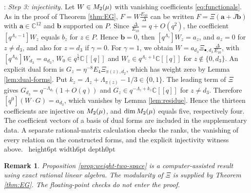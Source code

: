 \documentclass[leqno]{article}
\newcommand{\Cbb}{\ensuremath{\mathbb{C}}}
\let\cal\relax
\newcommand{\cal}{\mathcal}
\newcommand{\qed}{\hfill \vrule height6pt  width6pt depth0pt}
\newtheorem{remark}[thm]{Remark}
\newenvironment{proof}[1][]{\noindent {\it Proof #1} : }{\hbox{~}\qed
\smallskip
}
\numberwithin{equation}{section}
\begin{document}
\begin{proof}
\textit{Step 3: injectivity.} Let $W \in \cal M_2(\mu)$ with vanishing coefficients \eqref{eq:functionals}. As in the proof of Theorem \ref{thm:EG}, $F = W\frac{E_{10}}{\Delta}$ can be written $F = \Xi(\mathbf a+J\mathbf b)$ with $\mathbf a \in \Cbb^{12}$ and $\mathbf b$ supported on $P$. Since $\frac{\Delta}{E_{10}} = q+O(q^2)$, the coefficient $[q^{\Lambda_z-1}]W_z$ equals $b_z$ for $z \in P$. Hence $\mathbf b = 0$, then $[q^{\Lambda_z}]W_z = a_z$, and $a_z = 0$ for $z \neq d_3$, and also for $z = d_3$ if $\gamma = 0$. For $\gamma = 1$, we obtain $W = a_{d_3}\Xi_{\bullet,d_3}\frac{\Delta}{E_{10}}$, with $[q^{\Lambda_{d_3}}]W_{d_3} = a_{d_3}$, $W_0 \in q^{\frac53}\Cbb[[q]]$ and $W_z \in q^{\Lambda_z+1}\Cbb[[q]]$ for $z \notin \{0,d_3\}$. An explicit dual form is $G_z = \eta^{-8}E_4\Xi_{\pi(z),d_2}$, which has weight zero by Lemma \ref{lem:dual-forms}. Put $k_z = \Lambda_z+\Lambda_{\pi(z)}-1/3 \in \{0,1\}$. The leading term of $\Xi$ gives $G_{d_3} = q^{-\Lambda_{d_3}}(1+O(q))$ and $G_z \in q^{-\Lambda_z+k_z}\Cbb[[q]]$ for $z \neq d_3$. Therefore $[q^0](W\cdot G) = a_{d_3}$, which vanishes by Lemma \ref{lem:residue}. Hence the thirteen coefficients are injective on $\cal M_2(\mu)$, and $\dim \cal M_2(\mu)$ equals five, respectively four. The coefficient vectors of a basis of dual forms are included in the supplementary data. A separate rational-matrix calculation checks the ranks, the vanishing of every relation on the constructed forms, and the explicit injectivity witness above.
\end{proof}

\begin{remark}\normalfont
\label{rem:exactness}
Proposition \ref{prop:weight-two-space} is a computer-assisted result using exact rational linear algebra. The modularity of $\Xi$ is supplied by Theorem \ref{thm:EG}. The floating-point checks do not enter the proof.
\end{remark}
\end{document}

